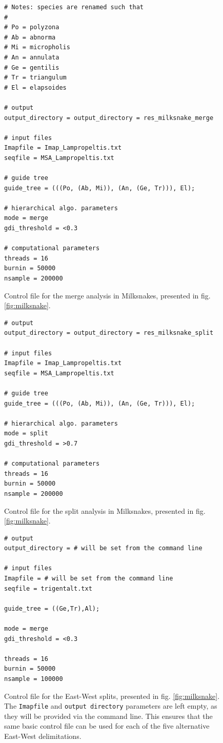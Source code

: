 \documentclass[A4]{article1}
\begin{document}
\begin{figure}[h]
	\footnotesize
	\begin{verbatim}
# Notes: species are renamed such that
#
# Po = polyzona
# Ab = abnorma
# Mi = micropholis
# An = annulata
# Ge = gentilis
# Tr = triangulum
# El = elapsoides

# output
output_directory = output_directory = res_milksnake_merge

# input files
Imapfile = Imap_Lampropeltis.txt
seqfile = MSA_Lampropeltis.txt

# guide tree
guide_tree = (((Po, (Ab, Mi)), (An, (Ge, Tr))), El);

# hierarchical algo. parameters
mode = merge
gdi_threshold = <0.3

# computational parameters
threads = 16
burnin = 50000
nsample = 200000
	\end{verbatim}
	
	\caption{Control file for the merge analysis in Milksnakes, presented in fig. \ref{fig:milksnake}. %
	} \label{fig:milksnake_mcf_merge}
\end{figure}

\begin{figure}[h]
	\footnotesize
	\begin{verbatim}
# output
output_directory = output_directory = res_milksnake_split

# input files
Imapfile = Imap_Lampropeltis.txt
seqfile = MSA_Lampropeltis.txt

# guide tree
guide_tree = (((Po, (Ab, Mi)), (An, (Ge, Tr))), El);

# hierarchical algo. parameters
mode = split
gdi_threshold = >0.7

# computational parameters
threads = 16
burnin = 50000
nsample = 200000
	\end{verbatim}
	
	\caption{Control file for the split analysis in Milksnakes, presented in fig. \ref{fig:milksnake}. %
	} \label{fig:milksnake_mcf_split}
\end{figure}

\begin{figure}[h]
	\footnotesize
	\begin{verbatim}
# output
output_directory = # will be set from the command line

# input files
Imapfile = # will be set from the command line
seqfile = trigentalt.txt

guide_tree = ((Ge,Tr),Al);

mode = merge
gdi_threshold = <0.3

threads = 16
burnin = 50000
nsample = 100000
	\end{verbatim}
	
	\caption{Control file for the East-West splits, presented in fig. \ref{fig:milksnake}. The \texttt{Imapfile} and \texttt{output directory} parameters are left empty, as they will be provided via the command line.
	This ensures that the same basic control file can be used for each of the five alternative East-West delimitations.%
	} \label{fig:milksnake_EW_mcf}
\end{figure}
\end{document}
